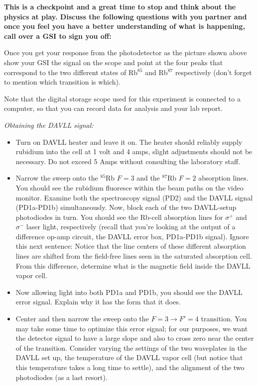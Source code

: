 \documentclass{../lab}
\begin{document}
\textbf{This is a checkpoint and a great time to stop and think about the physics at play. Discuss the following questions with you partner and once you feel you have a better understanding of what is happening, call over a GSI to sign you off:}

Once you get your response from the photodetector as the picture shown above show your GSI the signal on the scope and point at the four peaks that correspond to the two different states of Rb$^{85}$ and Rb$^{87}$ respectively (don't forget to mention which transition is which).

Note that the digital storage scope used for this experiment is connected to a computer, so that you can record data for analysis and your lab report.

\emph{Obtaining the DAVLL signal:}

\begin{itemize}
    \item Turn on DAVLL heater and leave it on. The heater should reliably supply rubidium into the cell at 1 volt and 4 amps, slight adjustments should not be necessary. Do not exceed 5 Amps without consulting the laboratory staff.

    \item Narrow the sweep onto the $^{85}$Rb $F=3 $ and the $^{87}$Rb $F=2 $ absorption lines. You should see the rubidium fluoresce within the beam paths on the video monitor. Examine both the spectroscopy signal (PD2) and the DAVLL signal (PD1a-PD1b) simultaneously. Now, block each of the two DAVLL-setup photodiodes in turn. You should see the Rb-cell absorption lines for $\sigma^+ $ and $\sigma^-$ laser light, respectively (recall that you're looking at the output of a difference op-amp circuit, the DAVLL error box, PD1a-PD1b signal). Ignore this next sentence: Notice that the line centers of these different absorption lines are shifted from the field-free lines seen in the saturated absorption cell. From this difference, determine what is the magnetic field inside the DAVLL vapor cell.

    \item Now allowing light into both PD1a and PD1b, you should see the DAVLL error signal. Explain why it has the form that it does.

    \item Center and then narrow the sweep onto the $F = 3 \rightarrow F' = 4 $ transition. You may take some time to optimize this error signal; for our purposes, we want the detector signal to have a large slope and also to cross zero near the center of the transition. Consider varying the settings of the two waveplates in the DAVLL set up, the temperature of the DAVLL vapor cell (but notice that this temperature takes a long time to settle), and the alignment of the two photodiodes (as a last resort).
\end{itemize}
\end{document}
